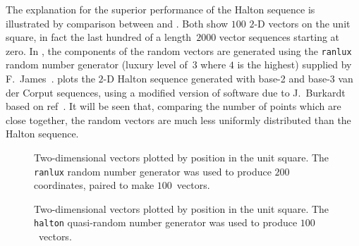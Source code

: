 The explanation for the superior performance of the Halton sequence 
is illustrated by comparison between  and .
Both show $100$ $2$-D vectors on the unit square, in fact the
last hundred of a length~$2000$ vector sequences starting at zero.
In , the components of the random vectors are generated
using the {\tt ranlux} random number generator (luxury level of~$3$ where $4$
is the highest) supplied by F.~James~\cite{Ja96RANL}.
 plots the $2$-D Halton sequence generated
with base-2 and base-3 van der Corput sequences, using
a modified version of software due to J.~Burkardt~\cite{burkardt}
based on ref~\cite{Fo86Imple}.  It will be seen that,
comparing the number of points which are close together,
the random vectors are much less uniformly distributed than
the Halton sequence.

\begin{figure}
\centerline{}
\caption{Two-dimensional vectors plotted by position in the unit square.
The {\tt ranlux} random number generator was used to produce $200$
coordinates, paired to make $100$~vectors.
\label{fig:ranlux}}
\end{figure}
\begin{figure}
\centerline{}
\caption{Two-dimensional vectors plotted by position in the unit square.
The {\tt halton} quasi-random number generator was used to produce $100$~vectors.
\label{fig:halton}}
\end{figure}

